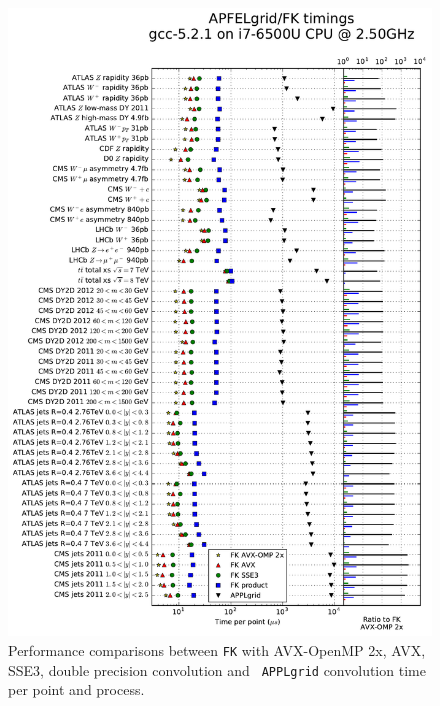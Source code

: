 \documentclass[preprint,12pt]{elsarticle}
\begin{document}

\begin{figure}
  \centering
  \includegraphics[scale=0.6]{plots/t0a}
\caption{\small Performance comparisons between {\tt FK} with
  AVX-OpenMP 2x, AVX, SSE3, double precision convolution and {\tt
    APPLgrid} convolution time per point and process.}
\label{fig:timings}
\end{figure}
\end{document}
